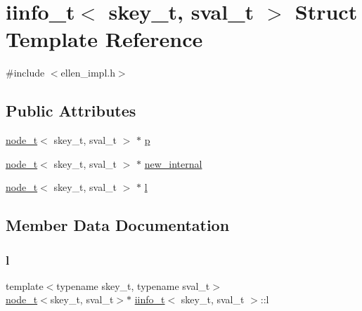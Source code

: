 \hypertarget{structiinfo__t}{}\section{iinfo\+\_\+t$<$ skey\+\_\+t, sval\+\_\+t $>$ Struct Template Reference}
\label{structiinfo__t}


{\ttfamily \#include $<$ellen\+\_\+impl.\+h$>$}

\subsection*{Public Attributes}
\begin{DoxyCompactItemize}
\item 
\hyperlink{structnode__t}{node\+\_\+t}$<$ skey\+\_\+t, sval\+\_\+t $>$ $\ast$ \hyperlink{structiinfo__t_ac481a80b2ca93f02845d28a7c2223a3f}{p}
\item 
\hyperlink{structnode__t}{node\+\_\+t}$<$ skey\+\_\+t, sval\+\_\+t $>$ $\ast$ \hyperlink{structiinfo__t_a19351f64d5a730afeac5393f91a944e6}{new\+\_\+internal}
\item 
\hyperlink{structnode__t}{node\+\_\+t}$<$ skey\+\_\+t, sval\+\_\+t $>$ $\ast$ \hyperlink{structiinfo__t_ab71cf537eecee9ec27ba800bd1a4ffa1}{l}
\end{DoxyCompactItemize}


\subsection{Member Data Documentation}
\mbox{\label{structiinfo__t_ab71cf537eecee9ec27ba800bd1a4ffa1}} 
\subsubsection{\texorpdfstring{l}{l}}
{\footnotesize\ttfamily template$<$typename skey\+\_\+t, typename sval\+\_\+t$>$ \\
\hyperlink{structnode__t}{node\+\_\+t}$<$skey\+\_\+t, sval\+\_\+t$>$$\ast$ \hyperlink{structiinfo__t}{iinfo\+\_\+t}$<$ skey\+\_\+t, sval\+\_\+t $>$\+::l}

\mbox{\label{structiinfo__t_a19351f64d5a730afeac5393f91a944e6}} 
